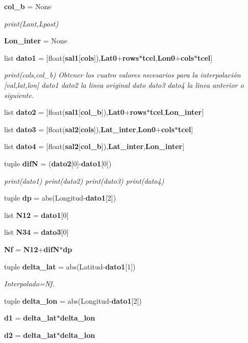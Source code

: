 \begin{DoxyCompactItemize}
\item 
{\bf col\-\_\-b} = None
\begin{DoxyCompactList}\small\item\em print(\-Lant,\-Lpost) \end{DoxyCompactList}\item 
{\bf Lon\-\_\-inter} = None
\item 
list {\bf dato1} = [float({\bf sal1}[{\bf cols}]),{\bf Lat0}+{\bf rows}$\ast${\bf tcel},{\bf Lon0}+{\bf cols}$\ast${\bf tcel}]
\begin{DoxyCompactList}\small\item\em print(cols,col\-\_\-b) Obtener los cuatro valores necesarios para la interpolación [val,lat,lon] dato1 dato2  la linea original dato dato3 dato4  la linea anterior o siguiente. \end{DoxyCompactList}\item 
list {\bf dato2} = [float({\bf sal1}[{\bf col\-\_\-b}]),{\bf Lat0}+{\bf rows}$\ast${\bf tcel},{\bf Lon\-\_\-inter}]
\item 
list {\bf dato3} = [float({\bf sal2}[{\bf cols}]),{\bf Lat\-\_\-inter},{\bf Lon0}+{\bf cols}$\ast${\bf tcel}]
\item 
list {\bf dato4} = [float({\bf sal2}[{\bf col\-\_\-b}]),{\bf Lat\-\_\-inter},{\bf Lon\-\_\-inter}]
\item 
tuple {\bf dif\-N} = ({\bf dato2}[0]-\/{\bf dato1}[0])
\begin{DoxyCompactList}\small\item\em print(dato1) print(dato2) print(dato3) print(dato4) \end{DoxyCompactList}\item 
tuple {\bf dp} = abs(Longitud-\/{\bf dato1}[2])
\item 
list {\bf N12} = {\bf dato1}[0]
\item 
list {\bf N34} = {\bf dato3}[0]
\item 
{\bf Nf} = {\bf N12}+{\bf dif\-N}$\ast${\bf dp}
\item 
tuple {\bf delta\-\_\-lat} = abs(Latitud-\/{\bf dato1}[1])
\begin{DoxyCompactList}\small\item\em Interpolado=Nf. \end{DoxyCompactList}\item 
tuple {\bf delta\-\_\-lon} = abs(Longitud-\/{\bf dato1}[2])
\item 
{\bf d1} = {\bf delta\-\_\-lat}$\ast${\bf delta\-\_\-lon}
\item 
{\bf d2} = {\bf delta\-\_\-lat}$\ast${\bf delta\-\_\-lon}

\end{DoxyCompactItemize}
